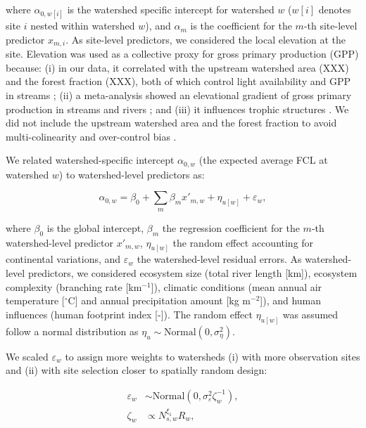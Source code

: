 \documentclass[11pt, class=article, crop=false]{standalone}
\begin{document}
where $\alpha_{0, w[i]}$ is the watershed specific intercept for watershed $w$ ($w[i]$ denotes site $i$ nested within watershed $w$), and $\alpha_m$ is the coefficient for the $m$-th site-level predictor $x_{m, i}$.
As site-level predictors, we considered the local elevation at the site. 
Elevation was used as a collective proxy for gross primary production (GPP) because: (i) in our data, it correlated with the upstream watershed area (XXX) and the forest fraction (XXX), both of which control light availability and GPP in streams \citep{finlay_light-mediated_2011, finlay_stream_2011, bernhardt_light_2022}; (ii) a meta-analysis showed an elevational gradient of gross primary production in streams and rivers \citep{marzolf_ecosystem_2021}; and (iii) it influences trophic structures \citep{oksanen_exploitation_1981}.
We did not include the upstream watershed area and the forest fraction to avoid multi-colinearity and over-control bias \citep{arif_predictive_2022}.

We related watershed-specific intercept $\alpha_{0, w}$ (the expected average FCL at watershed $w$) to watershed-level predictors as:

\begin{equation}
    \alpha_{0, w} = \beta_0 + \sum_m \beta_m x'_{m, w} + \eta_{u[w]} + \varepsilon_{w},
\end{equation}

where $\beta_0$ is the global intercept, $\beta_m$ the regression coefficient for the $m$-th watershed-level predictor $x'_{m, w}$, $\eta_{u[w]}$ the random effect accounting for continental variations, and $\varepsilon_w$ the watershed-level residual errors.
As watershed-level predictors, we considered ecosystem size (total river length [km]), ecosystem complexity (branching rate [km$^{-1}$]), climatic conditions (mean annual air temperature [$^\circ$C] and annual precipitation amount [kg m$^{-2}$]), and human influences (human footprint index [-]).
The random effect $\eta_{u[w]}$ was assumed follow a normal distribution as $\eta_{u} \sim \mbox{Normal}(0, \sigma_{\eta}^2)$.

We scaled $\varepsilon_w$ to assign more weights to watersheds (i) with more observation sites and (ii) with site selection closer to spatially random design:

\begin{align}
    \varepsilon_w &\sim \mbox{Normal}(0, \sigma_{\varepsilon}^2 \zeta_w^{-1}),\\
    \zeta_w &\propto N_{s, w}^{\xi_1} R_w,
\end{align}
\end{document}
